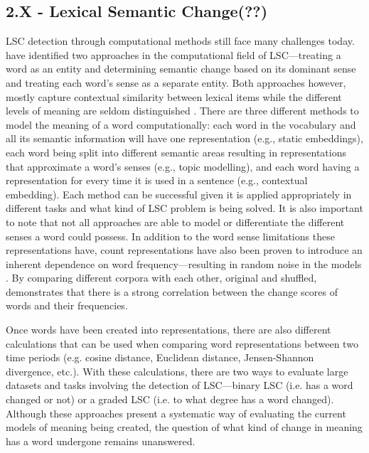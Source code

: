 \subsection{2.X - Lexical Semantic Change(??)}

LSC detection through computational methods still face many challenges today. \citet{hengchen2021challenges} have identified two approaches in the computational field of LSC—treating a word as an entity and determining semantic change based on its dominant sense and treating each word’s sense as a separate entity. Both approaches however, mostly capture contextual similarity between lexical items while the different levels of meaning are seldom distinguished \citep{hengchen2021challenges}. There are three different methods to model the meaning of a word computationally: each word in the vocabulary and all its semantic information will have one representation (e.g., static embeddings), each word being split into different semantic areas resulting in representations that approximate a word’s senses (e.g., topic modelling), and each word having a representation for every time it is used in a sentence (e.g., contextual embedding). Each method can be successful given it is applied appropriately in different tasks and what kind of LSC problem is being solved. It is also important to note that not all approaches are able to model or differentiate the different senses a word could possess. In addition to the word sense limitations these representations have, count representations have also been proven to introduce an inherent dependence on word frequency—resulting in random noise in the models \citep{dubossarsky-etal-2017-outta}. By comparing different corpora with each other, original and shuffled, \citet{dubossarsky-etal-2017-outta} demonstrates that there is a strong correlation between the change scores of words and their frequencies. 

Once words have been created into representations, there are also different calculations that can be used when comparing word representations between two time periods (e.g. cosine distance, Euclidean distance, Jensen-Shannon divergence, etc.). With these calculations, there are two ways to evaluate large datasets and tasks involving the detection of LSC—binary LSC (i.e. has a word changed or not) or a graded LSC (i.e. to what degree has a word changed). Although these approaches present a systematic way of evaluating the current models of meaning being created, the question of what kind of change in meaning has a word undergone remains unanswered.

